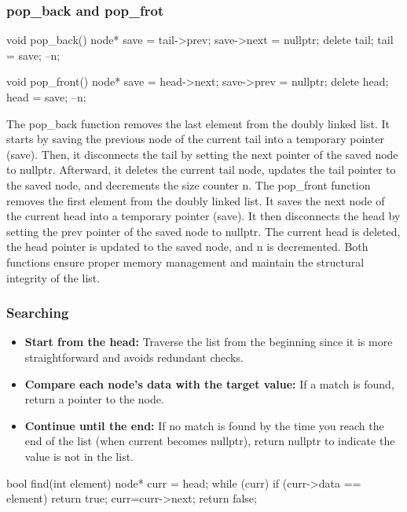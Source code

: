 \documentclass{report}
\begin{document}
    \subsubsection{pop\_back and pop\_frot}
    \bigbreak \noindent 
    \begin{cppcode}
        void pop_back() {
            node* save = tail->prev;
            save->next = nullptr;
            delete tail;
            tail = save;
            --n;
        }

        void pop_front() {
            node* save = head->next;
            save->prev = nullptr;
            delete head;
            head = save;
            --n;
        }
    \end{cppcode}
    \bigbreak \noindent 
    The pop\_back function removes the last element from the doubly linked list. It starts by saving the previous node of the current tail into a temporary pointer (save). Then, it disconnects the tail by setting the next pointer of the saved node to nullptr. Afterward, it deletes the current tail node, updates the tail pointer to the saved node, and decrements the size counter n.
    \bigbreak \noindent 
    The pop\_front function removes the first element from the doubly linked list. It saves the next node of the current head into a temporary pointer (save). It then disconnects the head by setting the prev pointer of the saved node to nullptr. The current head is deleted, the head pointer is updated to the saved node, and n is decremented. Both functions ensure proper memory management and maintain the structural integrity of the list.

    \pagebreak 
    \subsubsection{Searching}
    \bigbreak \noindent 
    \begin{itemize}
        \item \textbf{Start from the head:} Traverse the list from the beginning since it is more straightforward and avoids redundant checks.
        \item \textbf{Compare each node's data with the target value:} If a match is found, return a pointer to the node.
        \item \textbf{Continue until the end:} If no match is found by the time you reach the end of the list (when current becomes nullptr), return nullptr to indicate the value is not in the list.
    \end{itemize}
    \bigbreak \noindent 
    \begin{cppcode}
        bool find(int element) {
            node* curr = head;
            while (curr) {
                if (curr->data == element) return true;
                curr=curr->next;
            }
            return false;
        }
    \end{cppcode}
\end{document}

